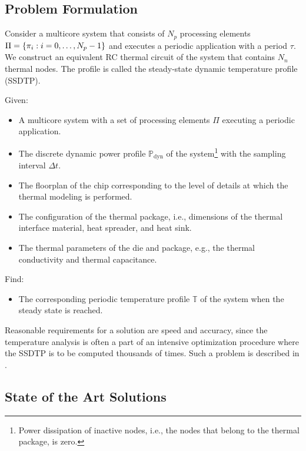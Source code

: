 \subsection{Problem Formulation}

Consider a multicore system that consists of $N_p$ processing elements $\Pi = \{
\pi_i: i = 0, \dots, N_p - 1 \}$ and executes a periodic application with a
period $\tau$. We construct an equivalent RC thermal circuit of the system that
contains $N_n$ thermal nodes.
The profile is called the steady-state dynamic temperature profile (SSDTP).

Given:
\begin{itemize}

\item A multicore system with a set of processing elements $\Pi$ executing a
periodic application.

\item The discrete dynamic power profile $\mathbb{P}_\text{dyn}$ of the
system\footnote{Power dissipation of inactive nodes, i.e., the nodes that belong
to the thermal package, is zero.} with the sampling interval $\Delta t$.

\item The floorplan of the chip corresponding to the level of details at which
the thermal modeling is performed.

\item The configuration of the thermal package, i.e., dimensions of the thermal
interface material, heat spreader, and heat sink.

\item The thermal parameters of the die and package, e.g., the thermal
conductivity and thermal capacitance.

\end{itemize}

Find:
\begin{itemize}

\item The corresponding periodic temperature profile $\mathbb{T}$ of the system
when the steady state is reached.

\end{itemize}
Reasonable requirements for a solution are speed and accuracy, since the
temperature analysis is often a part of an intensive optimization procedure
where the SSDTP is to be computed thousands of times. Such a problem is
described in .

\subsection{State of the Art Solutions}

